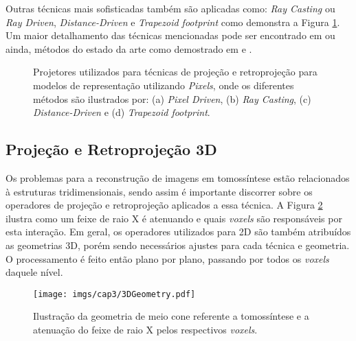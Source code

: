 Outras técnicas mais sofisticadas também são aplicadas como: \textit{Ray Casting} ou \textit{Ray Driven}, \textit{Distance-Driven} \cite{de2002distance,de2004distance} e \textit{Trapezoid footprint} como demonstra a Figura \ref{fig:imgCap3Projetores}. Um maior detalhamento das técnicas mencionadas pode ser encontrado em  ou ainda, métodos do estado da arte como demostrado em  e .

\begin{figure}[H]
	\centering
	
	\caption{Projetores utilizados para técnicas de projeção e retroprojeção para modelos de representação utilizando \textit{Pixels}, onde os diferentes métodos são ilustrados por: (a) \textit{Pixel Driven}, (b) \textit{Ray Casting}, (c) \textit{Distance-Driven} e (d) \textit{Trapezoid footprint}.}
	
	\hfil
	\hfil
	\hfil
	\hfil
	
	\label{fig:imgCap3Projetores}
\end{figure}  
  
\subsection{Projeção e Retroprojeção 3D}\label{ProjeçãoeRetroprojeção3D}

Os problemas para a reconstrução de imagens em tomossíntese estão relacionados à estruturas tridimensionais, sendo assim é importante discorrer sobre os operadores de projeção e retroprojeção aplicados a essa técnica. A Figura \ref{fig:imgCap33DGeometry} ilustra como um feixe de raio X é atenuando e quais \textit{voxels} são responsáveis por esta interação. Em geral, os operadores utilizados para \acs{2D} são também atribuídos as geometrias \acs{3D}, porém sendo necessários ajustes para cada técnica e geometria. O processamento é feito então plano por plano, passando por todos os \textit{voxels} daquele nível. 

\begin{figure}[H]
	\caption{Ilustração da geometria de meio cone referente a tomossíntese e a atenuação do feixe de raio X pelos respectivos \textit{voxels}.}
	\begin{center}
		\texttt{[image: imgs/cap3/3DGeometry.pdf]}
	\end{center}
	\label{fig:imgCap33DGeometry}
\end{figure}

